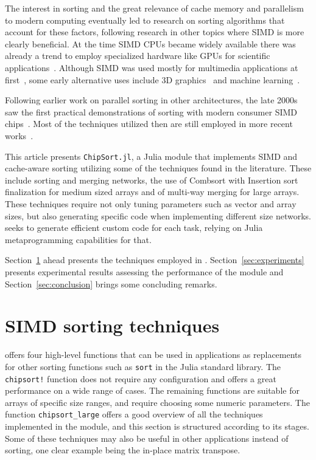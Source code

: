 \documentclass{juliacon}
\begin{document}
The interest in sorting and the great relevance of cache memory and parallelism to modern computing eventually led to research on sorting algorithms that account for these factors, following research in other topics where SIMD is more clearly beneficial. At the time SIMD CPUs became widely available there was already a trend to employ specialized hardware like GPUs for scientific applications~\cite{larsen2001fast,DBLP:conf/micro/ThompsonHO02}. Although SIMD was used mostly for multimedia applications at first~\cite{CHEN2006509,DBLP:journals/mam/SlingerlandS05}, some early alternative uses include 3D graphics~\cite{DBLP:conf/pcm/MaY02} and machine learning~\cite{DBLP:conf/europar/StreyB01}.

Following earlier work on parallel sorting in other architectures, the late 2000s saw the first practical demonstrations of sorting with modern consumer SIMD chips~\cite{DBLP:conf/IEEEpact/InoueMKN07,DBLP:journals/pvldb/ChhuganiNLMHCBKD08}. Most of the techniques utilized then are still employed in more recent works~\cite{DBLP:journals/pvldb/BalkesenATO13,DBLP:journals/pvldb/InoueT15}.

This article presents {\tt ChipSort.jl}, a Julia module that implements SIMD and cache-aware sorting utilizing some of the techniques found in the literature. These include sorting and merging networks, the use of Combsort with Insertion sort finalization for medium sized arrays and of multi-way merging for large arrays. These techniques require not only tuning parameters such as vector and array sizes, but also generating specific code when implementing different size networks. \chipsort seeks to generate efficient custom code for each task, relying on Julia metaprogramming capabilities for that.

Section~\ref{sec:methods} ahead presents the techniques employed in \chipsort. Section~\ref{sec:experiments} presents experimental results assessing the performance of the module and Section~\ref{sec:conclusion} brings some concluding remarks.

\section{SIMD sorting techniques}
\label{sec:methods}
%
\chipsort offers four high-level functions that can be used in applications as replacements for other sorting functions such as {\tt sort} in the Julia standard library. The {\tt chipsort!} function does not require any configuration and offers a great performance on a wide range of cases. The remaining functions are suitable for arrays of specific size ranges, and require choosing some numeric parameters. The function {\tt chipsort\_large} offers a good overview of all the techniques implemented in the module, and this section is structured according to its stages. Some of these techniques may also be useful in other applications instead of sorting, one clear example being the in-place matrix transpose.
\end{document}
